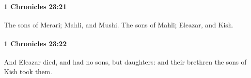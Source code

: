 		\paragraph{1 Chronicles 23:21} %
			\label{1CHRONICLES-23-21}

			The sons of Merari; Mahli, and Mushi. The sons of Mahli; Eleazar, and Kish.


		\paragraph{1 Chronicles 23:22} %
			\label{1CHRONICLES-23-22}

			And Eleazar died, and had no sons, but daughters: and their brethren the sons of Kish took them.


